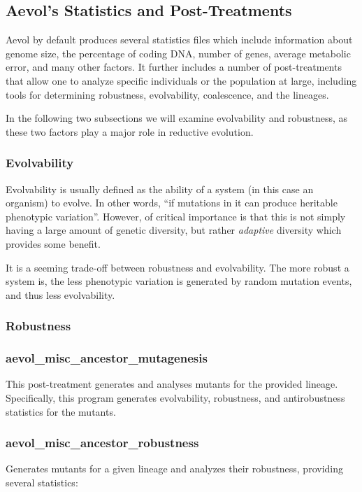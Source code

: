 \subsection{Aevol's Statistics and Post-Treatments}\label{aevol_post-treatments}
Aevol by default produces several statistics files which include information about genome size, the percentage of coding DNA, number of genes, average metabolic error, and many other factors.  It further includes a number of post-treatments that allow one to analyze specific individuals or the population at large, including tools for determining robustness, evolvability, coalescence, and the lineages. 

In the following two subsections we will examine evolvability and robustness, as these two factors play a major role in reductive evolution. 

\subsubsection{Evolvability}
Evolvability is usually defined as the ability of a system (in this case an organism) to evolve. In other words, ``if mutations in it can produce heritable phenotypic variation''\cite{doi:10.1098/rspb.2007.1137}. However, of critical importance is that this is not simply having a large amount of genetic diversity, but rather \textit{adaptive} diversity which provides some benefit. 

It is a seeming trade-off between robustness and evolvability. The more robust a system is, the less phenotypic variation is generated by random mutation events, and thus less evolvability. 

\subsubsection{Robustness}


\subsubsection{aevol\_misc\_ancestor\_mutagenesis}
This post-treatment generates and analyses mutants for the provided lineage. Specifically, this program generates evolvability, robustness, and antirobustness statistics for the mutants. 

\subsubsection{aevol\_misc\_ancestor\_robustness}
Generates mutants for a given lineage and analyzes their robustness, providing several statistics:



